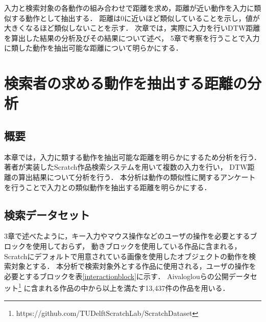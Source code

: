 \documentclass[11pt]{jreport}
\begin{document}
入力と検索対象の各動作の組み合わせで距離を求め，距離が近い動作を入力に類似する動作として抽出する．
距離は0に近いほど類似していることを示し，値が大きくなるほど類似しないことを示す．
次章では，実際に入力を行いDTW距離を算出した結果の分析及びその結果について述べ，
5章で考察を行うことで入力に類した動作を抽出可能な距離について明らかにする．


\chapter{検索者の求める動作を抽出する距離の分析}

\section{概要}
本章では，入力に類する動作を抽出可能な距離を明らかにするため分析を行う．
著者が実装したScratch作品検索システムを用いて複数の入力を行い，
DTW距離の算出結果について分析を行う．
本分析は動作の類似性に関するアンケートを行うことで入力との類似動作を抽出する距離を明らかにする．

\section{検索データセット}
3章で述べたように，キー入力やマウス操作などのユーザの操作を必要とするブロックを使用しておらず，
動きブロックを使用している作品に含まれる，
Scratchにデフォルトで用意されている画像を使用したオブジェクトの動作を検索対象とする．
本分析で検索対象外とする作品に使用される，ユーザの操作を必要とするブロックを表\ref{interactionblock}に示す．
Aivaloglouらの公開データセット\cite{dataset}\footnote{https://github.com/TUDelftScratchLab/ScratchDataset}
に含まれる作品の中から以上を満たす13,437件の作品を用いる．
\end{document}
